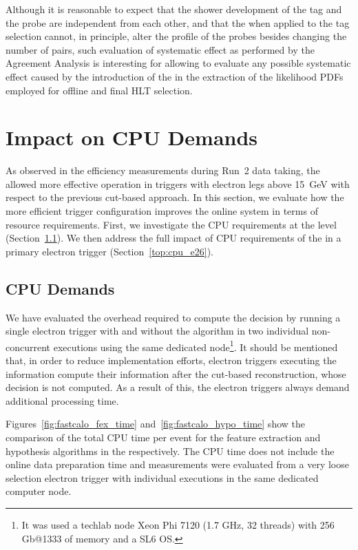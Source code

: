 Although it is reasonable to expect that the shower development of the tag and
the probe are independent from each other, and that the \rnn{} when applied to
the tag selection cannot, in principle, alter the profile of the probes besides
changing the number of \tnp{} pairs, such evaluation of systematic effect as
performed by the Agreement Analysis is interesting for allowing to evaluate any
possible systematic effect caused by the introduction of the \rnn{} in the extraction of the likelihood PDFs employed for offline and final HLT selection.

\FloatBarrier
\section{Impact on CPU Demands} %

As observed in the efficiency measurements during Run~2 data taking, the \rnn{}
allowed more effective \fastcalo{} operation in triggers with electron legs
above \SI{15}{\GeV}  with respect to the previous cut-based approach. In this section, we evaluate how the more efficient trigger
configuration improves the online system in terms of resource requirements.
First, we investigate the CPU requirements at the \fastcalo{}
level (Section~\ref{top:fastcalo_cpu}). We then address the full impact of CPU
requirements of the \rnn{} in a primary electron trigger
(Section~\ref{top:cpu_e26}).

\subsection{\fastcalo{} CPU Demands}\label{top:fastcalo_cpu}


We have evaluated the overhead required to compute the \rnn{} decision by running a single electron trigger with and without the \rnn algorithm in two individual non-concurrent executions using the same dedicated node\footnote{It was used a techlab node Xeon Phi 7120 (1.7 GHz, 32 threads) with 256 Gb@1333 of memory and a SL6 OS.}. It should be mentioned that, in order to reduce implementation efforts, electron triggers executing the \rnn{} information compute their information after the cut-based reconstruction, whose decision is not computed. As a result of this, the \rnn{} electron 
triggers always demand additional \fastcalo processing time.

Figures~\ref{fig:fastcalo_fex_time} and~\ref{fig:fastcalo_hypo_time} show the comparison of the total CPU time per event for the feature extraction and hypothesis algorithms in the \fastcalo respectively.
The CPU time does not include the online data preparation time and measurements were evaluated from a very loose selection electron trigger with individual executions in the same dedicated computer node.


